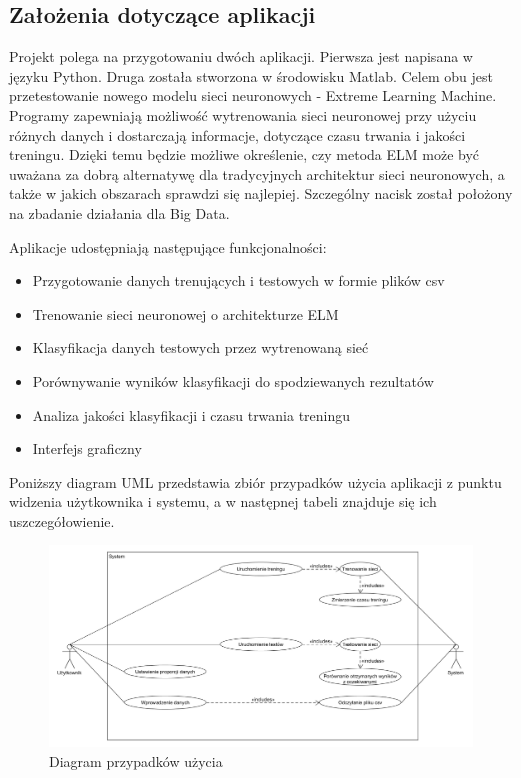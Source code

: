 \documentclass{article}
\begin{document}
\subsection{Założenia dotyczące aplikacji}
Projekt polega na przygotowaniu dwóch aplikacji. Pierwsza jest napisana w języku Python. Druga została stworzona w środowisku Matlab. Celem obu jest przetestowanie nowego modelu sieci neuronowych - Extreme Learning Machine. Programy zapewniają możliwość wytrenowania sieci neuronowej przy użyciu różnych danych i dostarczają informacje, dotyczące czasu trwania i jakości treningu. Dzięki temu będzie możliwe określenie, czy metoda ELM może być uważana za dobrą alternatywę dla tradycyjnych architektur sieci neuronowych, a także w jakich obszarach sprawdzi się najlepiej. Szczególny nacisk został położony na zbadanie działania dla Big Data.

Aplikacje udostępniają następujące funkcjonalności:
\begin{itemize}
\item Przygotowanie danych trenujących i testowych w formie plików csv
\item Trenowanie sieci neuronowej o architekturze ELM
\item Klasyfikacja danych testowych przez wytrenowaną sieć
\item Porównywanie wyników klasyfikacji do spodziewanych rezultatów
\item Analiza jakości klasyfikacji i  czasu trwania treningu
\item Interfejs graficzny
\end{itemize}
Poniższy diagram UML przedstawia zbiór przypadków użycia aplikacji z punktu widzenia użytkownika i systemu, a w następnej tabeli znajduje się ich uszczegółowienie.
\begin{figure}[H]
\includegraphics[width=\textwidth]{use_case.png}
\caption{Diagram przypadków użycia}
\end{figure}
\end{document}
